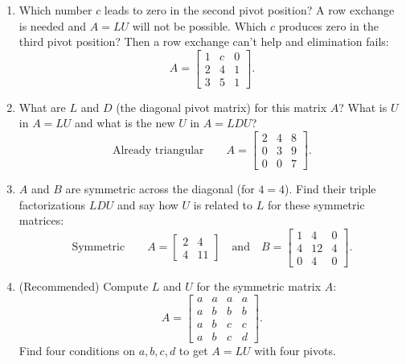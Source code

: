 \documentclass[14pt, a4paper]{article}
\begin{document}
\begin{enumerate}
    \item Which number $c$ leads to zero in the second pivot position? A row exchange is needed and $A = LU$ will not be possible. Which $c$ produces zero in the third pivot position? Then a row exchange can't help and elimination fails:
          \[
              A = \begin{bmatrix}
                  1 & c & 0 \\
                  2 & 4 & 1 \\
                  3 & 5 & 1
              \end{bmatrix}.
          \]

    \item What are $L$ and $D$ (the diagonal pivot matrix) for this matrix $A$? What is $U$ in $A = LU$ and what is the new $U$ in $A = LDU$?
          \[
              \text{Already triangular}\qquad
              A = \begin{bmatrix}
                  2 & 4 & 8 \\
                  0 & 3 & 9 \\
                  0 & 0 & 7
              \end{bmatrix}.
          \]

    \item $A$ and $B$ are symmetric across the diagonal (for $4=4$). Find their triple factorizations $LDU$ and say how $U$ is related to $L$ for these symmetric matrices:
          \[
              \text{Symmetric}\qquad
              A = \begin{bmatrix}
                  2 & 4 \\ 4 & 11
              \end{bmatrix}
              \quad\text{and}\quad
              B = \begin{bmatrix}
                  1 & 4  & 0 \\
                  4 & 12 & 4 \\
                  0 & 4  & 0
              \end{bmatrix}.
          \]

    \item (Recommended) Compute $L$ and $U$ for the symmetric matrix $A$:
          \[
              A = \begin{bmatrix}
                  a & a & a & a \\
                  a & b & b & b \\
                  a & b & c & c \\
                  a & b & c & d
              \end{bmatrix}.
          \]
          Find four conditions on $a,b,c,d$ to get $A = LU$ with four pivots.


\end{enumerate}
\end{document}
